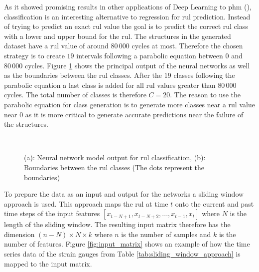 \documentclass[conference]{IEEEtran}
\begin{document}
As it showed promising results in other applications of Deep Learning to \gls{phm} (\cite{Liu2019a, Xiao2016}), classification is an interesting alternative to regression for \gls{rul} prediction. Instead of trying to predict an exact \gls{rul} value the goal is to predict the correct \gls{rul} class with a lower and upper bound for the \gls{rul}. The structures in the generated dataset have a \gls{rul} value of around $ 80\,000 $ cycles at most. Therefore the chosen strategy is to create $ 19 $ intervals following a parabolic equation between $ 0 $ and $ 80\,000 $ cycles. Figure \ref{fig:RNN_classification} shows the principal output of the neural networks as well as the boundaries between the \gls{rul} classes. After the $ 19 $ classes following the parabolic equation a last class is added for all \gls{rul} values greater than $ 80\,000 $ cycles. The total number of classes is therefore $ C = 20 $. The reason to use the parabolic equation for class generation is to generate more classes near a \gls{rul} value near $ 0 $ as it is more critical to generate accurate predictions near the failure of the structures.

\begin{figure}[htp]
	\centering
	\\
	\caption{(a): Neural network model output for \gls{rul} classification, (b): Boundaries between the \gls{rul} classes (The dots represent the boundaries)}
	\label{fig:RNN_classification}
\end{figure}

To prepare the data as an input and output for the networks a sliding window approach is used. This approach maps the \gls{rul} at time $ t $ onto the current and past time steps of the input features $ [x_{t-N+1}, x_{t-N+2},..., x_{t-1}, x_t] $ where $ N $ is the length of the sliding window. The resulting input matrix therefore has the dimension $ (n-N) \times N \times k $ where $ n $ is the number of samples and $ k $ is the number of features. Figure \ref{fig:input_matrix} shows an example of how the time series data of the strain gauges from Table \ref{tab:sliding_window_approach} is mapped to the input matrix.
\end{document}
